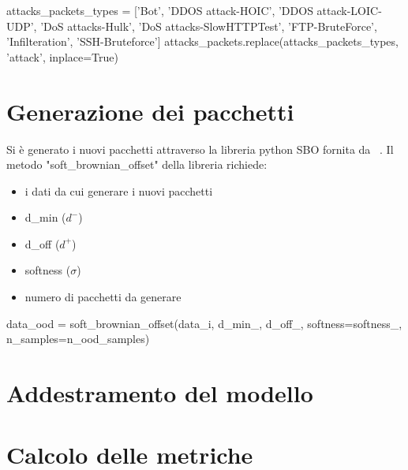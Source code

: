\begin{python}
attacks_packets_types = ['Bot', 'DDOS attack-HOIC', 'DDOS attack-LOIC-UDP',
                            'DoS attacks-Hulk', 'DoS attacks-SlowHTTPTest', 'FTP-BruteForce',
                            'Infilteration', 'SSH-Bruteforce']
attacks_packets.replace(attacks_packets_types, 'attack', inplace=True)
\end{python}


\section{Generazione dei pacchetti}

Si è generato i nuovi pacchetti attraverso la libreria python SBO fornita da ~\cite{sbo}. Il metodo "soft\_brownian\_offset" della libreria richiede:

\begin{itemize}
    \item i dati da cui generare i nuovi pacchetti
    \item d\_min ($d^{-}$)
    \item d\_off ($d^{+}$)
    \item softness ($\sigma$)
    \item numero di pacchetti da generare
\end{itemize}

\begin{python}
    data_ood = soft_brownian_offset(data_i, d_min_, d_off_,
                                        softness=softness_,
                                        n_samples=n_ood_samples)
\end{python}



\section{Addestramento del modello}

\section{Calcolo delle metriche}


